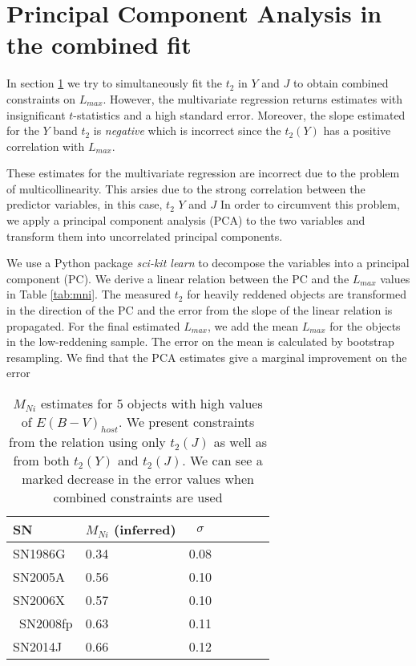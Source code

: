 \section{Principal Component Analysis in the combined fit}

In section \ref{} we try to simultaneously fit the $t_2$ in $Y$ and $J$ to obtain combined constraints on $L_{max}$. However, the multivariate regression returns estimates with insignificant $t$-statistics and a high standard error. Moreover, the slope estimated for the $Y$ band $t_2$ is \emph{negative} which is incorrect since the $t_2(Y)$ has a positive correlation with $L_{max}$. 

These estimates for the multivariate regression are incorrect due to the problem of multicollinearity. This arsies due to the strong correlation between the predictor variables, in this case, $t_2$ $Y$ and $J$ In order to circumvent this problem, we apply a principal component analysis (PCA) to the two variables and transform them into uncorrelated principal components. 

We use  a Python package \emph{sci-kit learn} to decompose the variables into a principal component (PC). We derive a linear relation between the PC and the $L_{max}$ values in Table \ref{tab:mni}. 
The measured $t_2$ for heavily reddened objects are transformed in the direction of the PC and the error from the slope of the linear relation is propagated. For the final estimated $L_{max}$, we add the mean $L_{max}$ for the objects in the low-reddening sample. The error on the mean is calculated by bootstrap resampling.  
We find that the PCA estimates give a marginal improvement on the error 

\begin{table}
\begin{center}
\caption{$M_{Ni}$ estimates for 5 objects with high values of $E(B-V)_{host}$. We present constraints from the relation using only $t_2(J)$ as well as from both $t_2(Y)$ and $t_2(J)$. We can see a marked decrease in the error values when combined constraints are used}
\begin{tabular}{llcccrr}
\hline
SN &  $M_{Ni}$ (inferred) & $\sigma$  \\
\hline
SN1986G	& 0.34 & 0.08	\\
SN2005A	& 0.56	&  0.10  \\
SN2006X	& 0.57 & 0.10  \\\
SN2008fp &  0.63 & 0.11 \\
SN2014J	& 0.66	& 0.12 \\

\hline
\end{tabular}
\label{tab:pca_red}
\end{center}
\end{table}
